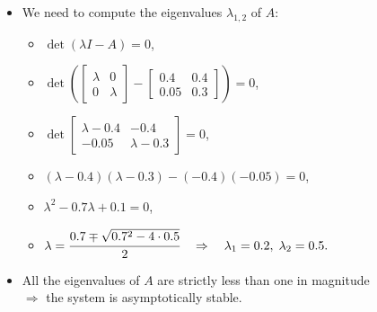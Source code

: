 \begin{frame}
\myPause
 \begin{itemize}[<+-| alert@+>]
 \item We need to compute the eigenvalues $\lambda_{1,2}$ of $A$:
       \begin{itemize}[<+-| alert@+>]
       \item[] \vspace{1mm}
               $\det(\lambda I -A) = 0$,
       \item[] \vspace{1mm}
               $\det \left(
                     \begin{bmatrix} \lambda & 0 \\ 0 & \lambda \end{bmatrix}
                    -\begin{bmatrix} 0.4 & 0.4 \\ 0.05 & 0.3 \end{bmatrix}
                     \right) = 0 $,
       \item[] \vspace{1mm}
               $\det \begin{bmatrix} \lambda-0.4 & -0.4 \\
                                    -0.05       & \lambda-0.3 \end{bmatrix} = 0 $,
       \item[] \vspace{1mm}
               $(\lambda-0.4)(\lambda-0.3)-(-0.4)(-0.05) = 0$,
       \item[] \vspace{1mm}
               $\lambda^2-0.7\lambda+0.1=0$,
       \item[] \vspace{1mm}
               $\lambda=\cfrac{0.7\mp\sqrt{0.7^2-4\cdot 0.5}}{2} \quad \Rightarrow \quad
                \lambda_1=0.2, \; \lambda_2=0.5.$
       \end{itemize}
 \item All the eigenvalues of $A$ are strictly less than one in magnitude\\
       $\Rightarrow$ the system is asymptotically stable.
 \end{itemize}
\end{frame}

